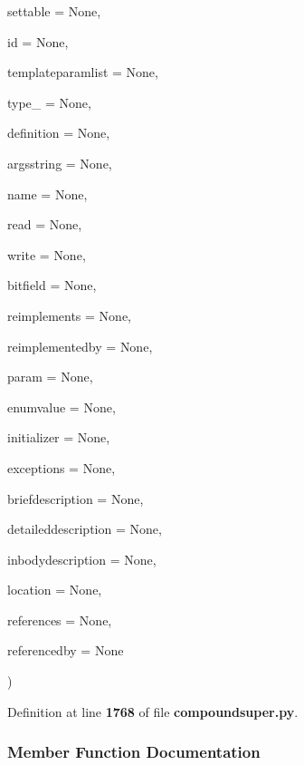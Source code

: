 {\begin{DoxyParamCaption}
\item[{}]{settable = {\ttfamily None}, }
\item[{}]{id = {\ttfamily None}, }
\item[{}]{templateparamlist = {\ttfamily None}, }
\item[{}]{type\+\_\+ = {\ttfamily None}, }
\item[{}]{definition = {\ttfamily None}, }
\item[{}]{argsstring = {\ttfamily None}, }
\item[{}]{name = {\ttfamily None}, }
\item[{}]{read = {\ttfamily None}, }
\item[{}]{write = {\ttfamily None}, }
\item[{}]{bitfield = {\ttfamily None}, }
\item[{}]{reimplements = {\ttfamily None}, }
\item[{}]{reimplementedby = {\ttfamily None}, }
\item[{}]{param = {\ttfamily None}, }
\item[{}]{enumvalue = {\ttfamily None}, }
\item[{}]{initializer = {\ttfamily None}, }
\item[{}]{exceptions = {\ttfamily None}, }
\item[{}]{briefdescription = {\ttfamily None}, }
\item[{}]{detaileddescription = {\ttfamily None}, }
\item[{}]{inbodydescription = {\ttfamily None}, }
\item[{}]{location = {\ttfamily None}, }
\item[{}]{references = {\ttfamily None}, }
\item[{}]{referencedby = {\ttfamily None}}
\end{DoxyParamCaption}
)}\label{classdoxyxml_1_1generated_1_1compoundsuper_1_1memberdefType_a38f82331e40eba4814e362b95cb34d77}


Definition at line {\bf 1768} of file {\bf compoundsuper.\+py}.



\subsubsection{Member Function Documentation}

